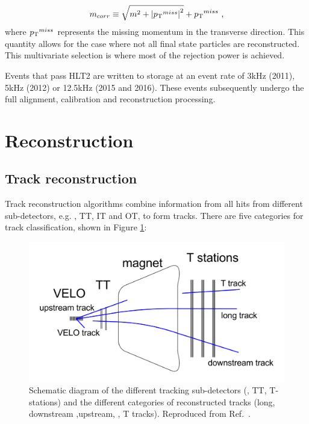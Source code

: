 \begin{equation}
m_{corr} \equiv \sqrt{m^2 + {| \mbox{$p_{\mathrm{ T}}$}^{miss} |}^2} + \mbox{$p_{\mathrm{ T}}$}^{miss} \text{ ,}
\end{equation}
where $\mbox{$p_{\mathrm{ T}}$}^{miss}$ represents the missing momentum in the transverse direction. This quantity allows for the case where not all final state particles are reconstructed. This multivariate selection is where most of the rejection power is achieved.

Events that pass HLT2 are written to storage at an event rate of 3kHz (2011), 5kHz (2012) or 12.5kHz (2015 and 2016). These events subsequently undergo the full alignment, calibration and reconstruction processing.

\section{Reconstruction}

\subsection{Track reconstruction}
\label{sec:detector:tracks}

Track reconstruction algorithms combine information from all hits from different sub-detectors, e.g. \velo, TT, IT and OT, to form tracks. There are five categories for track classification, shown in Figure \ref{tracktypes}:

\begin{figure}[h]
\includegraphics[width=\linewidth]{figures/detector/tracktypes.pdf}
\caption{Schematic diagram of the different tracking sub-detectors (\velo, TT, T-stations) and the different categories of reconstructed tracks (long, downstream ,upstream, \velo, T tracks). Reproduced from Ref.~\cite{LHCb-DP-2013-002}.}
\label{tracktypes}
\end{figure}

